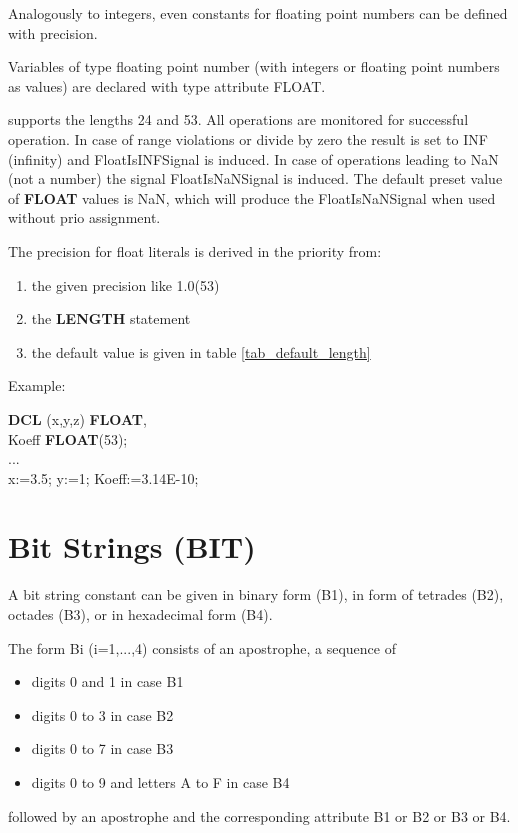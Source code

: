 Analogously to integers, even constants for floating point numbers can
be defined with precision.

Variables of type floating point number (with integers or floating point
numbers as values) are declared with type attribute FLOAT.




\OpenPEARL{} supports the lengths 24 and 53.
All operations are monitored for successful operation.
In case of range violations or
divide by zero the result is set to INF (infinity) and
FloatIsINFSignal is induced.
In case of operations leading to NaN (not a number) the signal
FloatIsNaNSignal is induced.
The default preset value of {\bf FLOAT} values is NaN, which will produce
the FloatIsNaNSignal when used without prio assignment.

The precision for float literals is derived in the priority from: 
\begin{enumerate}
\item the given precision like 1.0(53)
\item the {\bf LENGTH} statement
\item the default value is given in table \ref{tab_default_length}
\end{enumerate}

Example:

{\bf DCL} (x,y,z) {\bf FLOAT},\\
\x Koeff {\bf FLOAT}(53);\\
... \\
x:=3.5; y:=1; Koeff:=3.14E-10;

\section{Bit Strings (BIT)}  %
\label{sec_bit_strings}

A bit string constant can be given in binary form (B1), in form of
tetrades (B2), octades (B3), or in hexadecimal form (B4).

The form Bi (i=1,...,4) consists of an apostrophe, a sequence of
\begin{itemize}
\item digits 0 and 1 in case B1
\item digits 0 to 3 in case B2
\item digits 0 to 7 in case B3
\item digits 0 to 9 and letters A to F in case B4
\end{itemize}
followed by an apostrophe and the corresponding attribute B1 or B2 or
B3 or B4.

